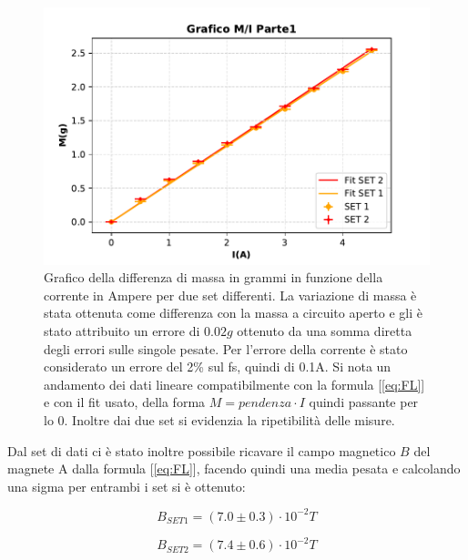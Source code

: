 {\fontsize{12}{14}\selectfont 
\begin{figure}[H]
  \centering
  \includegraphics[width=15cm]{Figures/GraficoMIParte1.pdf}
  \caption{Grafico della differenza di massa in grammi in funzione della corrente in Ampere per due set differenti. La variazione di massa è stata ottenuta come differenza con la massa a circuito aperto e gli è stato attribuito un errore di $0.02g$ ottenuto da una somma diretta degli errori sulle singole pesate. Per l'errore della corrente è stato considerato un errore del 2\% sul fs, quindi di 0.1A. Si nota un andamento dei dati lineare compatibilmente con la formula [\ref{eq:FL}] e con il fit usato, della forma $M = pendenza \cdot I$ quindi passante per lo 0. Inoltre dai due set si evidenzia la ripetibilità delle misure.}   
  \label{fig:GraficoParteI}
\end{figure}

Dal set di dati ci è stato inoltre possibile ricavare il campo magnetico $B$ del magnete A dalla formula [\ref{eq:FL}], facendo quindi una media pesata e calcolando una sigma per entrambi i set si è ottenuto:

\par
\begin{equation*}
    B_{SET1} = (7.0 \pm 0.3)\cdot 10^{-2}T
\end{equation*}

\begin{equation*}
    B_{SET2} = (7.4 \pm 0.6)\cdot 10^{-2}T 
\end{equation*}



}
